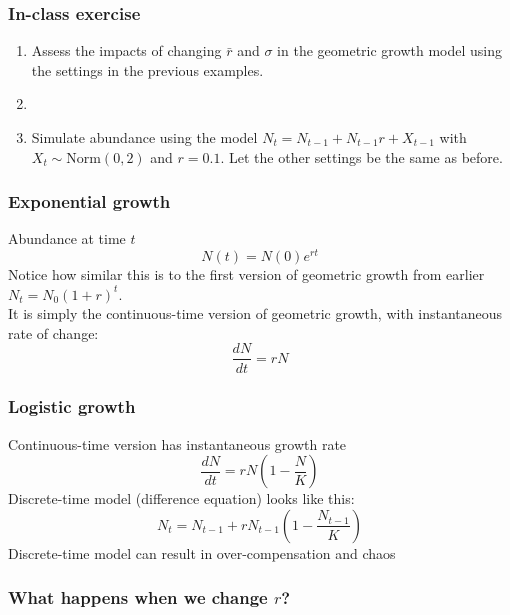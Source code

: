\documentclass[color=usenames,dvipsnames]{beamer}\usepackage[]{graphicx}\usepackage[]{color}
\begin{document}
\begin{frame}
  \frametitle{In-class exercise}
  \centering
  \begin{enumerate}
    \item<1-> Assess the impacts of changing $\bar{r}$ and $\sigma$ in the
      geometric growth model using the settings in the previous examples.
    \item[]
    \item<2-> Simulate abundance using the model $N_t = N_{t-1} +
      N_{t-1}r + X_{t-1}$ with $X_t \sim \mathrm{Norm}(0, 2)$ and
      $r=0.1$. Let the other settings be the same as before.
  \end{enumerate}
\end{frame}




\begin{frame}
  \frametitle{Exponential growth}
  Abundance at time $t$
  \[
    N(t) = N(0)e^{rt}
  \]
  \pause
  Notice how similar this is to the first version of geometric growth
  from earlier $N_t = N_0(1+r)^t$. \\
  \pause
  \vfill
  It is simply the continuous-time version of geometric growth, with
  instantaneous rate of change:
  \[
    \frac{dN}{dt} = rN
  \]
\end{frame}








\begin{frame}
  \frametitle{Logistic growth}
  Continuous-time version has instantaneous growth rate
  \[
    \frac{dN}{dt} = rN\left(1-\frac{N}{K}\right)
  \]
  \pause
  \vfill
  Discrete-time model (difference equation) looks like this:
  \[
    N_t = N_{t-1} + rN_{t-1}\left(1-\frac{N_{t-1}}{K}\right)
  \]
  \pause
  \vfill
  Discrete-time model can result in over-compensation and chaos
\end{frame}




\begin{frame}[fragile]
  \frametitle{What happens when we change $r$?}





\begin{center}
\end{center}
\end{frame}
\end{document}
